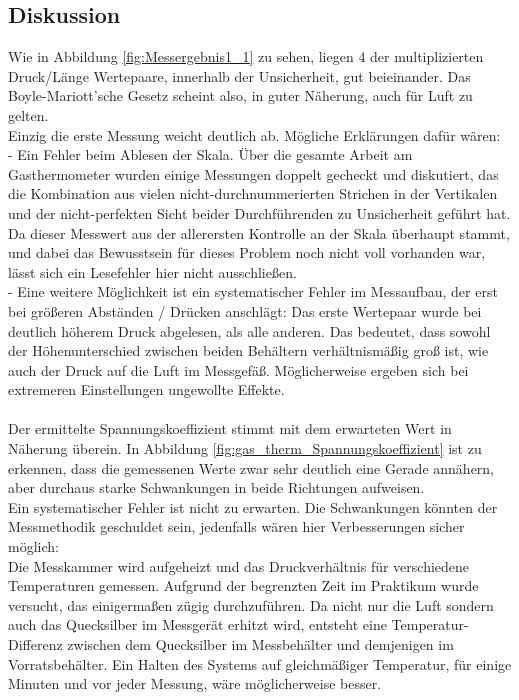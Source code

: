 \documentclass[12pt,a4paper]{article}
\begin{document}
\begin{multicols}{2}
\subsection{Diskussion}

Wie in Abbildung \ref{fig:Messergebnis1_1} zu sehen, liegen 4 der multiplizierten Druck/Länge Wertepaare, innerhalb der Unsicherheit, gut beieinander. Das Boyle-Mariott'sche Gesetz scheint also, in guter Näherung, auch für Luft zu gelten.\\
Einzig die erste Messung weicht deutlich ab. Mögliche Erklärungen dafür wären:\\
\indent - Ein Fehler beim Ablesen der Skala. Über die gesamte Arbeit am Gasthermometer wurden einige Messungen doppelt gecheckt und diskutiert, das die Kombination aus vielen nicht-durchnummerierten Strichen in der Vertikalen und der nicht-perfekten Sicht beider Durchführenden zu Unsicherheit geführt hat.\\
Da dieser Messwert aus der allerersten Kontrolle an der Skala überhaupt stammt, und dabei das Bewusstsein für dieses Problem noch nicht voll vorhanden war,  lässt sich ein Lesefehler hier nicht ausschließen.\\
\indent - Eine weitere Möglichkeit ist ein systematischer Fehler im Messaufbau, der erst bei größeren Abständen / Drücken anschlägt: Das erste Wertepaar wurde bei deutlich höherem Druck abgelesen, als alle anderen. Das bedeutet, dass sowohl der Höhenunterschied zwischen beiden Behältern verhältnismäßig groß ist, wie auch der Druck auf die Luft im Messgefäß. Möglicherweise ergeben sich bei extremeren Einstellungen ungewollte Effekte.\\
\\
Der ermittelte Spannungskoeffizient stimmt mit dem erwarteten Wert in Näherung überein. In Abbildung \ref{fig:gas_therm_Spannungskoeffizient} ist zu erkennen, dass die gemessenen Werte zwar sehr deutlich eine Gerade annähern, aber durchaus starke Schwankungen in beide Richtungen aufweisen.\\
Ein systematischer Fehler ist nicht zu erwarten. Die Schwankungen könnten der Messmethodik geschuldet sein, jedenfalls wären hier Verbesserungen sicher möglich:\\
Die Messkammer wird aufgeheizt und das Druckverhältnis für verschiedene Temperaturen gemessen. Aufgrund der begrenzten Zeit im Praktikum wurde versucht, das einigermaßen zügig durchzuführen. Da nicht nur die Luft sondern auch das Quecksilber im Messgerät erhitzt wird, entsteht eine Temperatur-Differenz zwischen dem Quecksilber im Messbehälter und demjenigen im Vorratsbehälter. Ein Halten des Systems auf gleichmäßiger Temperatur, für einige Minuten und vor jeder Messung, wäre möglicherweise besser.\\

\end{multicols}
\end{document}
